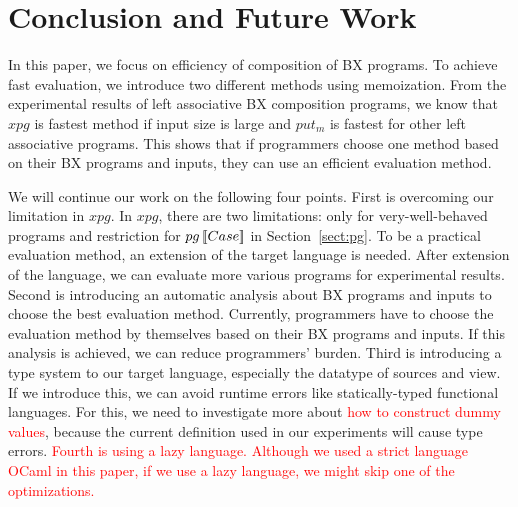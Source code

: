 \section{Conclusion and Future Work} \label{sect:conclusion}

In this paper, we focus on efficiency of composition of BX programs.
To achieve fast evaluation, we introduce two different methods using memoization.
From the experimental results of left associative BX composition programs, we know that $xpg$ is fastest method if input size is large and
$put_m$ is fastest for other left associative programs.
This shows that if programmers choose one method based on their BX programs and inputs, they can use an efficient evaluation method. 


We will continue our work on the following four points.
First is overcoming our limitation in $xpg$. In $xpg$, there are two limitations: only for very-well-behaved programs and restriction for $pg \, [\![Case]\!]$ in Section~\ref{sect:pg}. To be a practical evaluation method, an extension of the target language is needed. After extension of the language, we can evaluate more various programs for experimental results.
Second is introducing an automatic analysis about BX programs and inputs to choose the best evaluation method.
Currently, programmers have to choose the evaluation method by themselves based on their BX programs and inputs. If this analysis is achieved, we can reduce programmers' burden.
Third is introducing a type system to our target language, especially the datatype of sources and view. If we introduce this, we can avoid runtime errors like statically-typed functional languages. For this, we need to investigate more about \textcolor{red}{how to construct dummy values}, because the current definition used in our experiments %
will cause type errors.
\textcolor{red}{Fourth is using a lazy language. Although we used a strict language OCaml in this paper, if we use a lazy language, we might skip one of the optimizations.}






